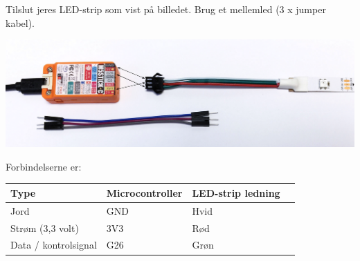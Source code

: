 \documentclass{ucph-handout}
\begin{document}
\begin{exercisebox}[adjusted title=Tilslut LED-strip]
Tilslut jeres LED-strip som vist på billedet. Brug et mellemled (3 x jumper kabel).
\begin{center}\includegraphics[width=1.0\textwidth]{illustrationer/m5stickc_ledstrip_connection3}
\end{center}

Forbindelserne er:
\begin{center}
\begin{tabular}{llll}
  \textbf{Type} & \textbf{Microcontroller} & \textbf{LED-strip ledning} \\
  \hline
 Jord & GND & Hvid \\
  Strøm (3,3 volt) & 3V3 & Rød \\
 Data / kontrolsignal & G26 & Grøn
\end{tabular}
\end{center}
\end{exercisebox}
\end{document}
